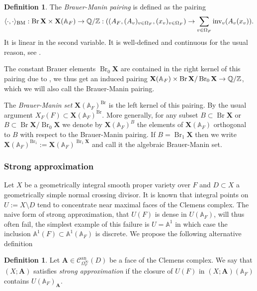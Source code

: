 \documentclass[a4paper,11pt,reqno]{amsart}
\newcommand{\Q}{\mathbb{Q}}
\newcommand{\A}{\mathbb{A}}
\DeclareMathOperator{\Br}{Br}
\DeclareMathOperator{\an}{an}
\theoremstyle{definition}
\newtheorem{definition}[theorem]{Definition}
\begin{document}
\begin{definition}
	The \emph{Brauer-Manin pairing} is defined as the pairing
	\begin{equation*}
		\langle \cdot, \cdot \rangle_{\text{BM}}: \Br \mathbf{X} \times \mathbf{X}(\A_F) \to \Q/\Z: ((A_F, (A_v)_{v \in \Omega_F}, (x_v)_{v \in \Omega_F}) \to \sum_{v \in \Omega_F} \text{inv}_v(A_v(x_v)).
	\end{equation*}
	It is linear in the second variable. It is well-defined and continuous for the usual reason, see \cite[Prop. 13.3.1]{Colliot2021Brauer}.
	
	The constant Brauer elements $\Br_0 \mathbf{X}$ are contained in the right kernel of this pairing due to \cite[Thm. 13.1.8]{Colliot2021Brauer}, we thus get an induced pairing $\mathbf{X}(\A_F) \times \Br \mathbf{X}/\Br_0 \mathbf{X} \to \Q/\Z$, which we will also call the Brauer-Manin pairing.
	
	The \emph{Brauer-Manin set} $\mathbf{X}(\A_F)^{\Br}$ is the left kernel of this pairing. By the usual argument $X_F(F) \subset \mathbf{X}(\A_F)^{\Br}$.
	More generally, for any subset $B \subset \Br \mathbf{X}$ or $B \subset \Br \mathbf{X}/\Br_0 \mathbf{X}$ we denote by $\mathbf{X}(\A_F)^{B}$ the elements of $\mathbf{X}(\A_F)$ orthogonal to $B$ with respect to the Brauer-Manin pairing. If $B = \Br_1 \mathbf{X}$ then we write $\mathbf{X}(\A_F)^{\Br_1} := \mathbf{X}(\A_F)^{\Br_1 \mathbf{X}}$ and call it the algebraic Brauer-Manin set.
\end{definition}

\subsubsection{Strong approximation}
Let $X$ be a geometrically integral smooth proper variety over $F$ and $D \subset X$ a geometrically simple normal crossing divisor. It is known that integral points on $U := X \setminus D$ tend to concentrate near maximal faces of the Clemens complex. The naive form of strong approximation, that $U(F)$ is dense in 
$U(\A_F)$, will thus often fail, the simplest example of this failure is $U = \A^1$ in which case the inclusion $\A^1(F) \subset \A^1(\A_F)$ is discrete. We propose the following alternative definition
\begin{definition}
	Let $\mathbf{A} \in \mathcal{C}^{\an}_{\Omega_{F}^{\infty}}(D)$ be a face of the Clemens complex. We say that $(X ; \mathbf{A})$ satisfies \emph{strong approximation} if the closure of $U(F)$ in $(X; \mathbf{A})(\A_F)$ contains $U(\A_F)_{\mathbf{A}}$.
\end{definition}
\end{document}

